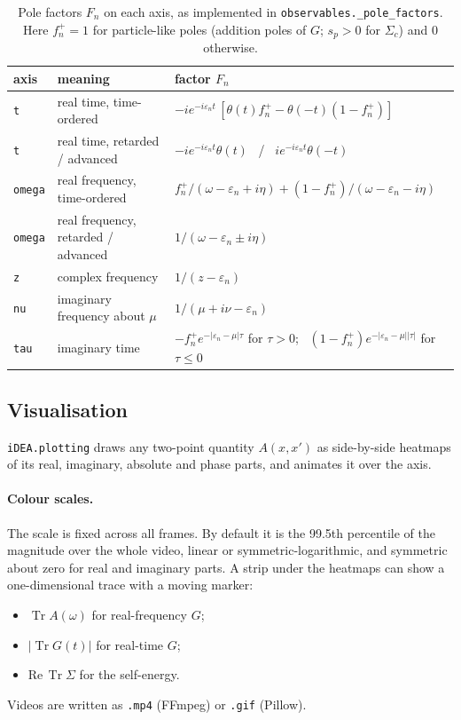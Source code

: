 \documentclass[11pt,a4paper]{article}
\newcommand{\code}[1]{\texttt{#1}}
\newcommand{\Tr}{\operatorname{Tr}}
\begin{document}
\begin{table}[t]
\centering\small
\caption{Pole factors $F_n$ on each axis, as implemented in \code{observables.\_pole\_factors}. Here $f_n^+ = 1$ for particle-like poles (addition poles of $G$; $s_p>0$ for $\Sigma_c$) and $0$ otherwise.}
\label{tab:axes}
\begin{tabularx}{\textwidth}{l>{\raggedright\arraybackslash}p{4.2cm}Y}
\toprule
axis & meaning & factor $F_n$ \\
\midrule
\code{t} & real time, time-ordered & $-ie^{-i\varepsilon_nt}\,[\theta(t)f^+_n - \theta(-t)(1-f^+_n)]$ \\
\code{t} & real time, retarded / advanced & $-ie^{-i\varepsilon_nt}\theta(t)$ \ / \ $ie^{-i\varepsilon_nt}\theta(-t)$ \\
\code{omega} & real frequency, time-ordered & $f^+_n/(\omega-\varepsilon_n+i\eta) + (1-f^+_n)/(\omega-\varepsilon_n-i\eta)$ \\
\code{omega} & real frequency, retarded / advanced & $1/(\omega-\varepsilon_n\pm i\eta)$ \\
\code{z} & complex frequency & $1/(z-\varepsilon_n)$ \\
\code{nu} & imaginary frequency about $\mu$ & $1/(\mu+i\nu-\varepsilon_n)$ \\
\code{tau} & imaginary time & $-f^+_ne^{-|\varepsilon_n-\mu|\tau}$ for $\tau>0$; \ $(1-f^+_n)e^{-|\varepsilon_n-\mu||\tau|}$ for $\tau\le0$ \\
\bottomrule
\end{tabularx}
\end{table}

\subsection{Visualisation}
\label{sec:visualisation}

\code{iDEA.plotting} draws any two-point quantity $A(x,x')$ as side-by-side heatmaps of its real, imaginary, absolute and phase parts, and animates it over the axis.

\paragraph{Colour scales.} The scale is fixed across all frames. By default it is the 99.5th percentile of the magnitude over the whole video, linear or symmetric-logarithmic, and symmetric about zero for real and imaginary parts. A strip under the heatmaps can show a one-dimensional trace with a moving marker:
\begin{itemize}
\item $\Tr A(\omega)$ for real-frequency $G$;
\item $|\Tr G(t)|$ for real-time $G$;
\item $\mathrm{Re}\,\Tr\Sigma$ for the self-energy.
\end{itemize}
Videos are written as \code{.mp4} (FFmpeg) or \code{.gif} (Pillow).
\end{document}
